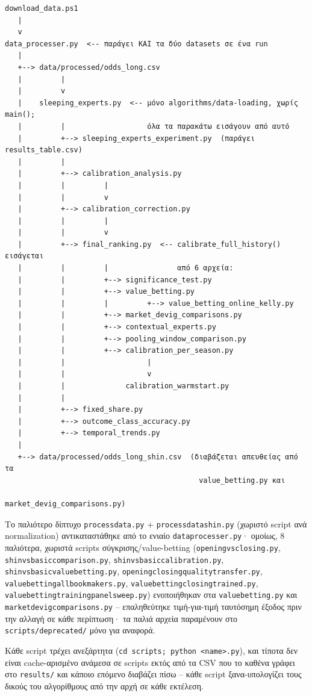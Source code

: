 \documentclass[11pt,a4paper]{article}
\newcommand{\file}[1]{\texttt{#1}}
\renewcommand{\_}{\oldunderscore\allowbreak}
\begin{document}
{\small
\begin{verbatim}
download_data.ps1
   |
   v
data_processer.py  <-- παράγει ΚΑΙ τα δύο datasets σε ένα run
   |
   +--> data/processed/odds_long.csv
   |         |
   |         v
   |    sleeping_experts.py  <-- μόνο algorithms/data-loading, χωρίς main();
   |         |                   όλα τα παρακάτω εισάγουν από αυτό
   |         +--> sleeping_experts_experiment.py  (παράγει results_table.csv)
   |         |
   |         +--> calibration_analysis.py
   |         |         |
   |         |         v
   |         +--> calibration_correction.py
   |         |         |
   |         |         v
   |         +--> final_ranking.py  <-- calibrate_full_history() εισάγεται
   |         |         |                από 6 αρχεία:
   |         |         +--> significance_test.py
   |         |         +--> value_betting.py
   |         |         |         +--> value_betting_online_kelly.py
   |         |         +--> market_devig_comparisons.py
   |         |         +--> contextual_experts.py
   |         |         +--> pooling_window_comparison.py
   |         |         +--> calibration_per_season.py
   |         |                   |
   |         |                   v
   |         |              calibration_warmstart.py
   |         |
   |         +--> fixed_share.py
   |         +--> outcome_class_accuracy.py
   |         +--> temporal_trends.py
   |
   +--> data/processed/odds_long_shin.csv  (διαβάζεται απευθείας από τα
                                             value_betting.py και
                                             market_devig_comparisons.py)
\end{verbatim}
}

Το παλιότερο δίπτυχο \file{process\_data.py} + \file{process\_data\_shin.py} (χωριστό
script ανά normalization) αντικαταστάθηκε από το ενιαίο \file{data\_processer.py}·
ομοίως, 8 παλιότερα, χωριστά scripts σύγκρισης/value-betting (\file{opening\_vs\_closing.py},
\file{shin\_vs\_basic\_comparison.py}, \file{shin\_vs\_basic\_calibration.py},
\file{shin\_vs\_basic\_value\_betting.py}, \file{opening\_closing\_quality\_transfer.py},
\file{value\_betting\_all\_bookmakers.py}, \file{value\_betting\_closing\_trained.py},
\file{value\_betting\_training\_panel\_sweep.py}) ενοποιήθηκαν στα \file{value\_betting.py}
και \file{market\_devig\_comparisons.py} -- επαληθεύτηκε τιμή-για-τιμή ταυτόσημη έξοδος πριν
την αλλαγή σε κάθε περίπτωση· τα παλιά αρχεία παραμένουν στο \file{scripts/deprecated/} μόνο
για αναφορά.

Κάθε script τρέχει ανεξάρτητα (\texttt{cd scripts; python <name>.py}), και τίποτα δεν είναι
cache-αρισμένο ανάμεσα σε scripts εκτός από τα CSV που το καθένα γράφει στο \file{results/}
και κάποιο επόμενο διαβάζει πίσω -- κάθε script ξανα-υπολογίζει τους δικούς του αλγορίθμους
από την αρχή σε κάθε εκτέλεση.
\end{document}
